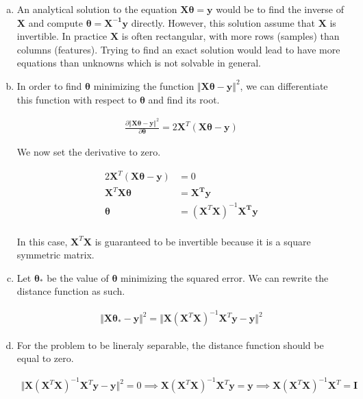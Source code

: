 \documentclass[a4paper, 10pt, twoside]{article}
\begin{document}
\begin{enumerate}[a)]
    \item An analytical solution to the equation $\bm{X\theta}= \bm{y}$ would be to find the inverse of $\bm{X}$ and compute $\bm{\theta} = \bm{X^{-1}y}$ directly. However, this solution assume that $\bm{X}$ is invertible. In practice $\bm{X}$ is often rectangular, with more rows (samples) than columns (features). Trying to find an exact solution would lead to have more equations than unknowns which is not solvable in general.

    \item  In order to find $\bm{\theta}$ minimizing the function $\Vert \bm{X \theta - y} \Vert^2$, we can differentiate this function with respect to $\bm{\theta}$ and find its root.

          \begin{align*}
              \frac{\partial \Vert \bm{X \theta} - \bm{y} \Vert^2}{\partial \bm{\theta}}
              = 2 \bm{X}^T(\bm{X \theta - y})
          \end{align*}

          We now set the derivative to zero.

          \begin{align*}
              2 \bm{X}^T(\bm{X \theta} - \bm{y}) & = 0                                   \\
              \bm{X}^T\bm{X \theta }             & = \bm{X^T y}                          \\
              \bm{\theta}                        & = ( \bm{X}^T \bm{X} )^{-1} \bm{X^T y} \\
          \end{align*}

          In this case, $\bm{X}^T \bm{X}$ is guaranteed to be invertible because it is a square symmetric matrix.

    \item Let $\bm{\theta_*}$ be the value of $\bm{\theta}$ minimizing the squared error. We can rewrite the distance function as such.

          \begin{align*}
              \Vert \bm{X \theta_* - y} \Vert^2 = \Vert \bm{X} (\bm{X}^T\bm{X})^{-1}\bm{X}^T \bm{y} - \bm{y} \Vert^2
          \end{align*}

    \item For the problem to be lineraly separable, the distance function should be equal to zero.

          \begin{align*}
              \Vert \bm{X} (\bm{X}^T\bm{X})^{-1}\bm{X}^T \bm{y} - \bm{y} \Vert^2 = 0
              \implies
              \bm{X} (\bm{X}^T\bm{X})^{-1}\bm{X}^T \bm{y} = \bm{y}
              \implies
              \bm{X} (\bm{X}^T\bm{X})^{-1}\bm{X}^T = \bm{I}
          \end{align*}

\end{enumerate}
\end{document}

